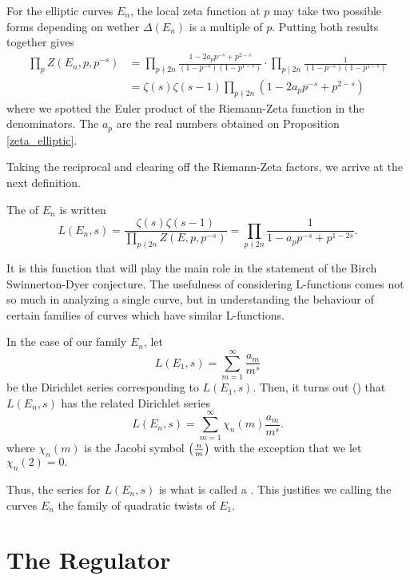 \documentclass[12pt, a4paper]{report}
\begin{document}
For the elliptic curves $E_n$, the local zeta function at $p$ may take two possible forms
depending on wether $\Delta(E_n)$ is a multiple of $p$. Putting both results
together gives
\[
  \begin{split}
    \prod\limits_{p} Z(E_n, p, p^{-s}) &= \prod\limits_{p \nmid 2n}
    \frac{1-2a_pp^{-s} + p^{2-s}}{(1-p^{-s})(1-p^{1-s})} \cdot \prod\limits_{p \mid
      2n} \frac{1}{(1-p^{-s})(1-p^{1-s})} \\  &=\zeta(s) \zeta(s-1) \prod\limits_{p
      \nmid 2n} (1 - 2a_pp^{-s} + p^{2-s})
  \end{split}
\]
where we spotted the Euler product of the Riemann-Zeta function in the
denominators. The $a_p$ are the real numbers obtained on
Proposition \autoref{zeta_elliptic}.

Taking the reciprocal and clearing off the Riemann-Zeta factors, we arrive at
the next definition.

\begin{defn}
  The  of $E_n$ is written
  \begin{equation} \label{eq:lfunction}
    L(E_n, s) = \frac{\zeta(s) \zeta(s-1)}{\prod_{p \nmid 2n} Z(E, p, p^{-s})}
    = \prod\limits_{p \nmid 2n} \frac{1}{1-a_pp^{-s} + p^{1-2s}}.
  \end{equation}
\end{defn}

It is this function that will play the main role in the statement of the Birch
Swinnerton-Dyer conjecture. The usefulness of considering L-functions comes not
so much in analyzing a single curve, but in understanding the behaviour of
certain families of curves which have similar L-functions.

In the case of our family $E_n$, let
\[L(E_1,s) = \sum\limits_{m=1}^\infty \frac{a_m}{m^s}\]
be the Dirichlet series corresponding to $L(E_1,s)$. Then, it turns out
(\cite[See][Pages 80-81]{koblitz}) that
$L(E_n,s)$ has the related Dirichlet series
\[L(E_n,s) = \sum_{m=1}^\infty \chi_n(m) \frac{a_m}{m^s}. \]
where $\chi_n(m)$ is the Jacobi symbol
$\left(\frac{n}{m}\right)$ with the exception that we let $\chi_n(2) = 0.$

Thus, the series for $L(E_n,s)$ is what is called a . This justifies we calling
the curves $E_n$ the family of quadratic twists of $E_1$.

\section{The Regulator}
\end{document}
